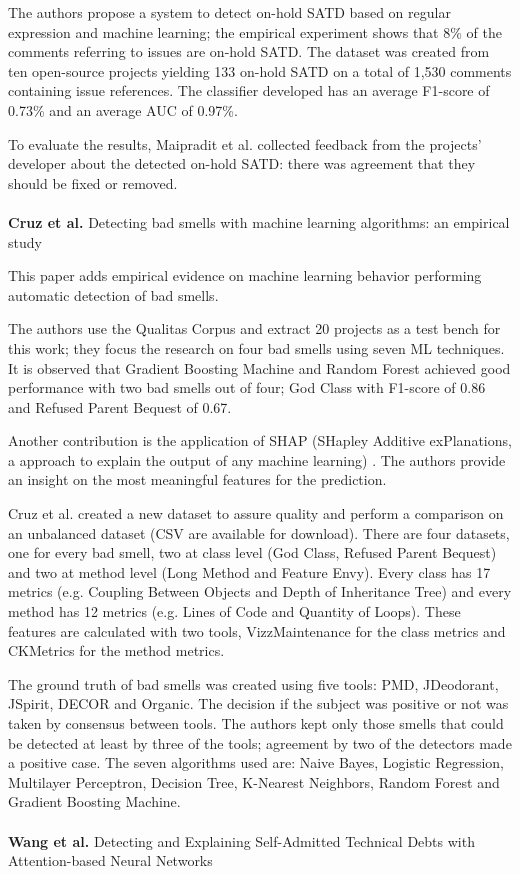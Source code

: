 The authors propose a system to detect on-hold SATD based on regular expression and machine learning; the empirical experiment shows that 8\% of the comments referring to issues are on-hold SATD. The dataset was created from ten open-source projects yielding 133 on-hold SATD on a total of 1,530 comments containing issue references.
The classifier developed has an average F1-score of 0.73\% and an average AUC of 0.97\%. 

To evaluate the results, Maipradit et al. collected feedback from the projects' developer about the detected on-hold SATD: there was agreement that they should be fixed or removed.
\\
\\
\textbf{Cruz et al.} \cite{cruz2020detecting} Detecting bad smells with machine learning algorithms: an empirical study

This paper adds empirical evidence on machine learning behavior performing automatic detection of bad smells.

The authors use the Qualitas Corpus \cite{tempero2010qualitas} and extract 20 projects as a test bench for this work; they focus the research on four bad smells using seven ML techniques.
It is observed that Gradient Boosting Machine and Random Forest achieved good performance with two bad smells out of four; God Class with F1-score of 0.86 and Refused Parent Bequest of 0.67.

Another contribution is the application of SHAP (SHapley Additive exPlanations, a approach to explain the output of any machine learning) \cite{NIPS2017_7062}. The authors provide an insight on the most meaningful features for the prediction. 

Cruz et al. created a new dataset to assure quality and perform a comparison on an unbalanced dataset (CSV are available for download).
There are four datasets, one for every bad smell, two at class level (God Class, Refused Parent Bequest) and two at method level (Long Method and Feature Envy). Every class has 17 metrics (e.g. Coupling Between Objects and Depth of Inheritance Tree) and every method has 12 metrics (e.g. Lines of Code and Quantity of Loops).
These features are calculated with two tools, VizzMaintenance for the class metrics and CKMetrics for the method metrics.

The ground truth of bad smells was created using five tools: PMD, JDeodorant, JSpirit, DECOR and Organic. The decision if the subject was positive or not was taken by consensus between tools. The authors kept only those smells that could be detected at least by three of the tools; agreement by two of the detectors made a positive case.
The seven algorithms used are: Naive Bayes, Logistic Regression, Multilayer Perceptron, Decision Tree, K-Nearest Neighbors, Random Forest and Gradient Boosting Machine.
\\
\\
\textbf{Wang et al.} \cite{wang2020detecting} Detecting and Explaining Self-Admitted Technical Debts with Attention-based Neural Networks

